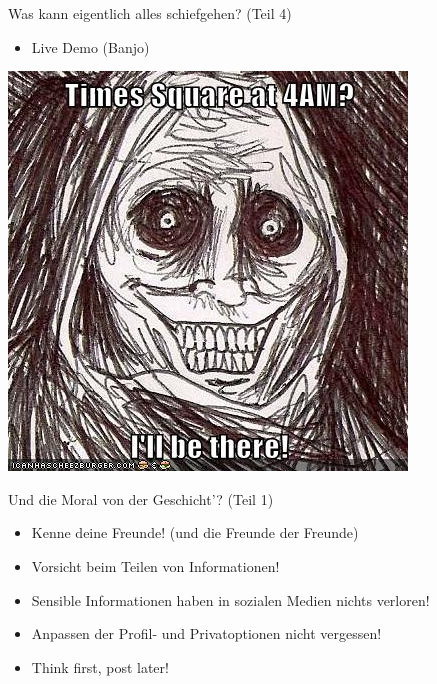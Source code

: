 \begin{frame}
	Was kann eigentlich alles schiefgehen? (Teil 4)
	\begin{itemize}
		\item Live Demo (Banjo)
	\end{itemize}
	\includegraphics[scale=0.5]{socialmedia-memes/shadowlurker_meme.jpg}
\end{frame}

\begin{frame}
	Und die Moral von der Geschicht'? (Teil 1)
	\begin{itemize}
	\item Kenne deine Freunde! (und die Freunde der Freunde)
	\item Vorsicht beim Teilen von Informationen!
	\item Sensible Informationen haben in sozialen Medien nichts verloren!
	\item Anpassen der Profil- und Privatoptionen nicht vergessen!
	\item Think first, post later!
	\end{itemize}
\end{frame}

